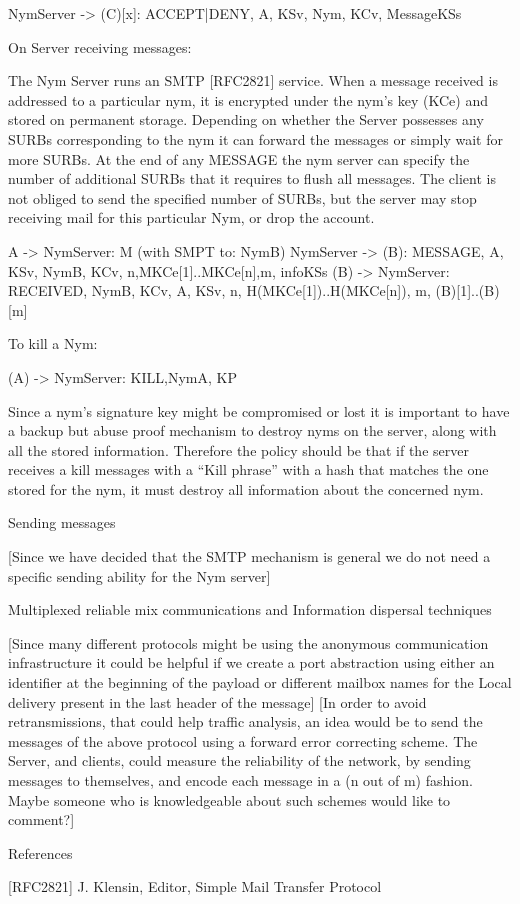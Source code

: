 NymServer -> (C)[x]: {ACCEPT|DENY, A, KSv, Nym, KCv, Message}KSs

On Server receiving messages:

The Nym Server runs an SMTP [RFC2821] service. When a message
received is addressed to a particular nym, it is encrypted under the
nym's key (KCe) and stored on permanent storage. Depending on whether
the Server possesses any SURBs corresponding to the nym it can forward
the messages or simply wait for more SURBs. At the end of any MESSAGE
the nym server can specify the number of additional SURBs that it
requires to flush all messages. The client is not obliged to send the
specified number of SURBs, but the server may stop receiving mail for
this particular Nym, or drop the account.

A -> NymServer: M (with SMPT to: NymB)
NymServer -> (B): {MESSAGE, A, KSv, NymB, KCv,
                   n,{M}KCe[1]..{M}KCe[n],m, info}KSs
(B) -> NymServer: {RECEIVED,  NymB, KCv, A, KSv, n,
                   H({M}KCe[1])..H({M}KCe[n]), m, (B)[1]..(B)[m]}

To kill a Nym:

(A) -> NymServer: KILL,NymA, KP

Since a nym's signature key might be compromised or lost it is
important to have a backup but abuse proof mechanism to destroy nyms
on the server, along with all the stored information. Therefore the
policy should be that if the server receives a kill messages with a
``Kill phrase'' with a hash that matches the one stored for the nym,
it must destroy all information about the concerned nym.

Sending messages

[Since we have decided that the SMTP mechanism is general we do not
  need a specific sending ability for the Nym server]

Multiplexed reliable mix communications and Information dispersal techniques

[Since many different protocols might be using the anonymous
  communication infrastructure it could be helpful if we create a port
  abstraction using either an identifier at the beginning of the
  payload or different mailbox names for the Local delivery present in
  the last header of the message] 
[In order to avoid retransmissions, that could help traffic analysis,
  an idea would be to send the messages of the above protocol using a
  forward error correcting scheme. The Server, and clients, could
  measure the reliability of the network, by sending messages to
  themselves, and encode each message in a (n out of m) fashion. Maybe
  someone who is knowledgeable about such schemes would like to comment?]

References

[RFC2821] J. Klensin, Editor, Simple Mail Transfer Protocol

